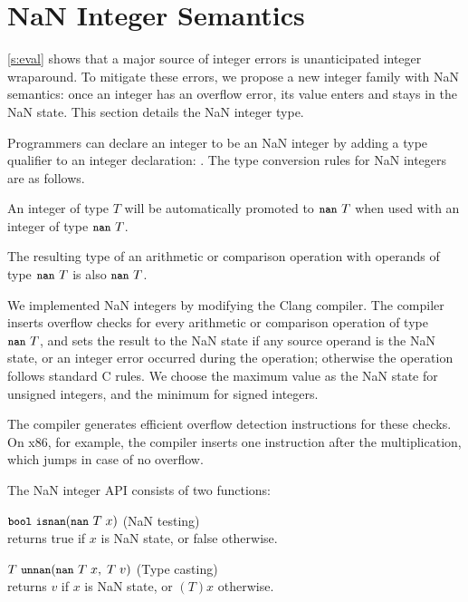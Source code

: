 \section{NaN Integer Semantics}
\label{s:miti}

\autoref{s:eval} shows that a major source of integer errors is unanticipated
integer wraparound.  To mitigate these errors, we propose a new integer family
with NaN semantics: once an integer has an overflow error, its value enters and
stays in the NaN state. This section details the NaN integer type.

Programmers can declare an integer to be an NaN integer by adding a type
qualifier  to an integer declaration: . The type conversion
rules for NaN integers are as follows.
\begin{CompactItemize}
\item
An integer of type $T$ will be automatically promoted to $\cc{nan}\ T$
when used with an integer of type $\cc{nan}\ T$.
\item
The resulting type of an arithmetic or comparison operation with
operands of type $\cc{nan}\ T$ is also $\cc{nan}\ T$.
\end{CompactItemize}

We implemented NaN integers by modifying the Clang compiler.
The compiler inserts overflow checks for every arithmetic or
comparison operation of type $\cc{nan}\ T$, and sets the result to the
NaN state if any source operand is the NaN state, or an integer error occurred
during the operation; otherwise the operation follows standard C rules.
We choose the maximum value as the NaN state for unsigned integers,
and the minimum for signed integers.

The compiler generates efficient overflow detection instructions
for these checks. On x86, for example,
the compiler inserts one  instruction after the 
multiplication, which jumps in case of no overflow.

The NaN integer API consists of two functions:
\begin{CompactItemize}
\item
$\cc{bool}\ \cc{isnan}(\cc{nan}\ T\; x)$ \hfill (NaN testing) \\
returns true if $x$ is NaN state, or false otherwise.
\item
$T\ \cc{unnan}(\cc{nan}\ T\; x,\; T\; v)$ \hfill (Type casting) \\
returns $v$ if $x$ is NaN state, or $(T)x$ otherwise.
\end{CompactItemize}

